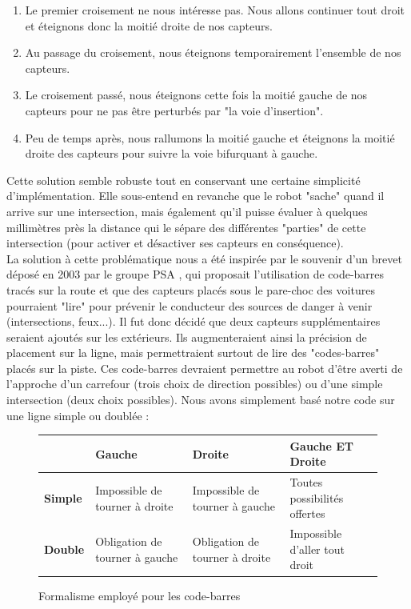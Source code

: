 
		\begin{enumerate}
			\item Le premier croisement ne nous intéresse pas. Nous allons continuer tout droit et éteignons donc la moitié droite de nos capteurs.
			\item Au passage du croisement, nous éteignons temporairement l'ensemble de nos capteurs.
			\item Le croisement passé, nous éteignons cette fois la moitié gauche de nos capteurs pour ne pas être perturbés par "la voie d'insertion".
			\item Peu de temps après, nous rallumons la moitié gauche et éteignons la moitié droite des capteurs pour suivre la voie bifurquant à gauche.
		\end{enumerate}

		Cette solution semble robuste tout en conservant une certaine simplicité d’implémentation. Elle sous-entend en revanche que le robot "sache" quand il arrive sur une intersection, mais également qu'il puisse évaluer à quelques millimètres près la distance qui le sépare des différentes "parties" de cette intersection (pour activer et désactiver ses capteurs en conséquence).\\

		La solution à cette problématique nous a été inspirée par le souvenir d'un brevet déposé en 2003 par le groupe PSA \cite{bib5}, qui proposait l'utilisation de code-barres tracés sur la route et que des capteurs placés sous le pare-choc des voitures pourraient "lire" pour prévenir le conducteur des sources de danger à venir (intersections, feux...).
		Il fut donc décidé que deux capteurs supplémentaires seraient ajoutés sur les extérieurs. Ils augmenteraient ainsi la précision de placement sur la ligne, mais permettraient surtout de lire des "codes-barres" placés sur la piste. Ces code-barres devraient permettre au robot d'être averti de l'approche d'un carrefour (trois choix de direction possibles) ou d'une simple intersection (deux choix possibles). Nous avons simplement basé notre code sur une ligne simple ou doublée :\\
		\begin{figure}[H]
			\begin{tabu}to 
			  \hline
			   & \textbf{Gauche} & \textbf{Droite} & \textbf{Gauche ET Droite} \\
			  \hline
			  \textbf{Simple} & Impossible de tourner à droite & Impossible de tourner à gauche & Toutes possibilités offertes\\
			  \hline
			  \textbf{Double} & Obligation de tourner à gauche & Obligation de tourner à droite & Impossible d'aller tout droit \\
			  \hline
			\end{tabu}
			\caption{Formalisme employé pour les code-barres}
		\end{figure}

